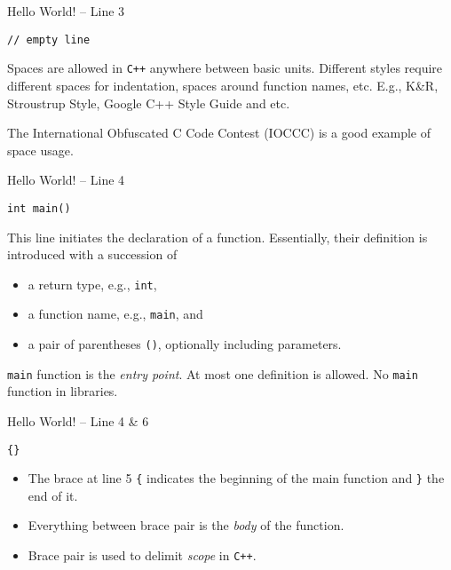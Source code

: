 \documentclass[presentation]{beamer}
\begin{document}
\begin{frame}[fragile,label={sec:orgheadline6}]{Hello World! -- Line 3}
 \begin{verbatim}
// empty line
\end{verbatim}

Spaces are allowed in \texttt{C++} anywhere between basic units.
Different styles require different spaces for indentation, spaces
around function names, etc.  E.g., K\&R, Stroustrup Style, Google
C++ Style Guide and etc.

The International Obfuscated C Code Contest (IOCCC) is a good
example of space usage.
\end{frame}

\begin{frame}[fragile,label={sec:orgheadline7}]{Hello World! -- Line 4}
 \begin{verbatim}
int main()
\end{verbatim}

This line initiates the declaration of a function.  Essentially,
their definition is introduced with a succession of
\begin{itemize}
\item a return type, e.g., \texttt{int},
\item a function name, e.g., \texttt{main}, and
\item a pair of parentheses \texttt{()}, optionally including parameters.
\end{itemize}


\texttt{main} function is the \emph{entry point}.  At most one definition is
allowed.  No \texttt{main} function in libraries.
\end{frame}

\begin{frame}[fragile,label={sec:orgheadline8}]{Hello World! -- Line 4 \& 6}
 \begin{verbatim}
{}
\end{verbatim}

\begin{itemize}
\item The brace at line 5 \texttt{\{} indicates the beginning of the main
function and \texttt{\}} the end of it.
\item Everything between brace pair is the \emph{body} of the function.
\item Brace pair is used to delimit \emph{scope} in \texttt{C++}.
\end{itemize}
\end{frame}
\end{document}
